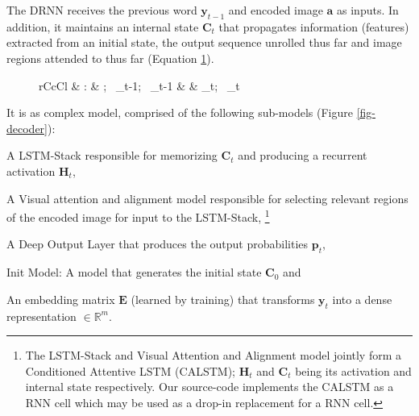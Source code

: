 \documentclass{article}
\begin{document}
The DRNN receives the previous word $\boldsymbol{y}_{t-1}$ and encoded image $\boldsymbol{a}$ as inputs. In addition, it maintains an internal state $\boldsymbol{C}_t$ that propagates information (features) extracted from an initial state, the output sequence unrolled thus far and image regions attended to thus far (Equation \ref{eqn-rnn}).
	\begin{figure}
	\begin{IEEEeqnarray}{rCcCl}
		 & : & \lbrace {}; \,  _{t-1}; \, _{t-1} \rbrace & \rightarrow & \lbrace  {}_t; \, _{t} \rbrace \label{eqn-rnn}
	\end{IEEEeqnarray}
\end{figure}
It is as complex model, comprised of the following sub-models (Figure \ref{fig-decoder}):
\begin{enumerate*}[label=\arabic*)]
	\item A {LSTM-Stack} \cite{Hochreiter:1997:LSM:1246443.1246450} responsible for memorizing $\boldsymbol{C}_t$ and producing a recurrent activation $\boldsymbol{H}_{t}$,
	\item A Visual {attention} and alignment model responsible for selecting relevant regions of the encoded image for input to the LSTM-Stack, \footnote{The LSTM-Stack and Visual Attention and Alignment model jointly form a Conditioned Attentive LSTM (CALSTM); $\boldsymbol{H}_t$ and $\boldsymbol{C}_t$ being its activation and internal state respectively. Our source-code implements the CALSTM as a RNN cell which may be used as a drop-in replacement for a RNN cell.}
	\item A {Deep Output} Layer \cite{Pascanu2013HowTC} that produces the output probabilities $\boldsymbol{p}_t$,
	\item {Init Model}: A model that generates the initial state $\boldsymbol{C}_{0}$ and
	\item An {embedding} matrix $\boldsymbol{E}$ (learned by training) that transforms $\boldsymbol{y}_t$ into a dense representation $\in \mathbb{R}^m$.
\end{enumerate*}
\end{document}
